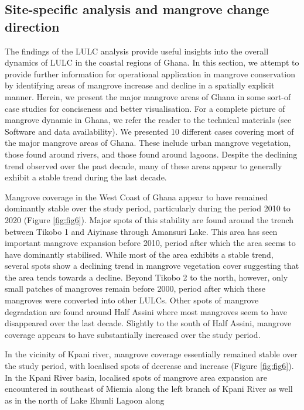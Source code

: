 \documentclass[12pt,oneside,preprint,3p,authoryear,times]{elsarticle} %
\begin{document}
\hypertarget{site-specific-analysis-and-mangrove-change-direction}{%
\subsection{Site-specific analysis and mangrove change
direction}\label{site-specific-analysis-and-mangrove-change-direction}}

The findings of the LULC analysis provide useful insights into the
overall dynamics of LULC in the coastal regions of Ghana. In this
section, we attempt to provide further information for operational
application in mangrove conservation by identifying areas of mangrove
increase and decline in a spatially explicit manner. Herein, we present
the major mangrove areas of Ghana in some sort-of case studies for
conciseness and better visualisation. For a complete picture of mangrove
dynamic in Ghana, we refer the reader to the technical materials (see
Software and data availability). We presented 10 different cases
covering most of the major mangrove areas of Ghana. These include urban
mangrove vegetation, those found around rivers, and those found around
lagoons. Despite the declining trend observed over the past decade, many
of these areas appear to generally exhibit a stable trend during the
last decade.

Mangrove coverage in the West Coast of Ghana appear to have remained
dominantly stable over the study period, particularly during the period
2010 to 2020 (Figure \ref{fig:fig6}). Major spots of this stability are
found around the trench between Tikobo 1 and Aiyinase through Amansuri
Lake. This area has seen important mangrove expansion before 2010,
period after which the area seems to have dominantly stabilised. While
most of the area exhibits a stable trend, several spots show a declining
trend in mangrove vegetation cover suggesting that the area tends
towards a decline. Beyond Tikobo 2 to the north, however, only small
patches of mangroves remain before 2000, period after which these
mangroves were converted into other LULCs. Other spots of mangrove
degradation are found around Half Assini where most mangroves seem to
have disappeared over the last decade. Slightly to the south of Half
Assini, mangrove coverage appears to have substantially increased over
the study period.

In the vicinity of Kpani river, mangrove coverage essentially remained
stable over the study period, with localised spots of decrease and
increase (Figure \ref{fig:fig6}). In the Kpani River basin, localised
spots of mangrove area expansion are encountered in southeast of Miemia
along the left branch of Kpani River as well as in the north of Lake
Ehunli Lagoon along
\end{document}
